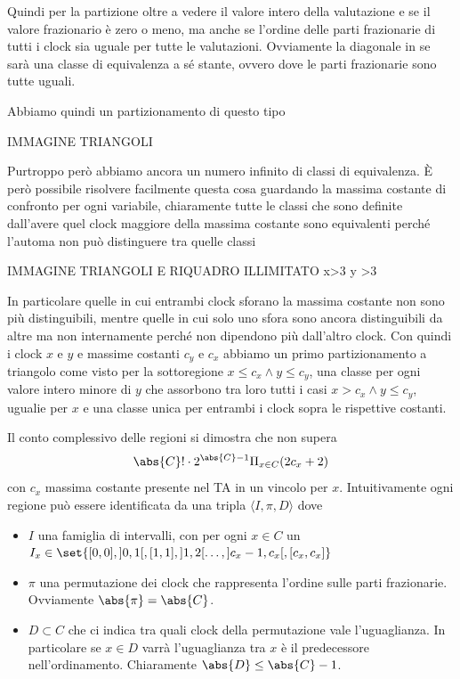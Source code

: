 Quindi per la partizione oltre a vedere il valore intero della valutazione e se il valore frazionario è zero o meno, ma anche se l'ordine delle parti frazionarie di tutti i clock sia uguale per tutte le valutazioni. Ovviamente la diagonale in se sarà una classe di equivalenza a sé stante, ovvero dove le parti frazionarie sono tutte uguali.

Abbiamo quindi un partizionamento di questo tipo

IMMAGINE TRIANGOLI

Purtroppo però abbiamo ancora un numero infinito di classi di equivalenza. È però possibile risolvere facilmente questa cosa guardando la massima costante di confronto per ogni variabile, chiaramente tutte le classi che sono definite dall'avere quel clock maggiore della massima costante sono equivalenti perché l'automa non può distinguere tra quelle classi

IMMAGINE TRIANGOLI E RIQUADRO ILLIMITATO x>3 y >3

In particolare quelle in cui entrambi clock sforano la massima costante non sono più distinguibili, mentre quelle in cui solo uno sfora sono ancora distinguibili da altre ma non internamente perché non dipendono più dall'altro clock. Con quindi i clock \(x\) e \(y\) e massime costanti \(c_y\) e \(c_x\) abbiamo un primo partizionamento a triangolo come visto per la sottoregione \(x\leq c_x \land y \leq c_y\), una classe per ogni valore intero minore di \(y\) che assorbono tra loro tutti i casi \(x> c_x \land y \leq c_y\), ugualie per \(x\) e una classe unica per entrambi i clock sopra le rispettive costanti.

Il conto complessivo delle regioni si dimostra che non supera
\[\abs{C}! \cdot 2^{\abs{C}-1}\Pi_{x \in C} (2c_x+2)\]
 con \(c_x\) massima costante presente nel TA in un vincolo per \(x\). Intuitivamente ogni regione può essere identificata da una tripla \(\langle I, \pi, D\rangle\) dove
\begin{itemize}
  \item \(I\) una famiglia di intervalli, con per ogni \(x \in C\) un  \(I_x \in \set{[0,0], ]0,1[, [1,1], ]1,2[\ldots,]c_x-1,c_x[,[c_x,c_x]}\)
  \item \(\pi\) una permutazione dei clock che rappresenta l'ordine sulle parti frazionarie. Ovviamente \(\abs{\pi} = \abs{C}\).
  \item \(D\subset C\) che ci indica tra quali clock della permutazione vale l'uguaglianza. In particolare se \(x\in D\) varrà l'uguaglianza tra \(x\) è il predecessore nell'ordinamento. Chiaramente \(\abs{D}\leq\abs{C}-1\).
\end{itemize}

